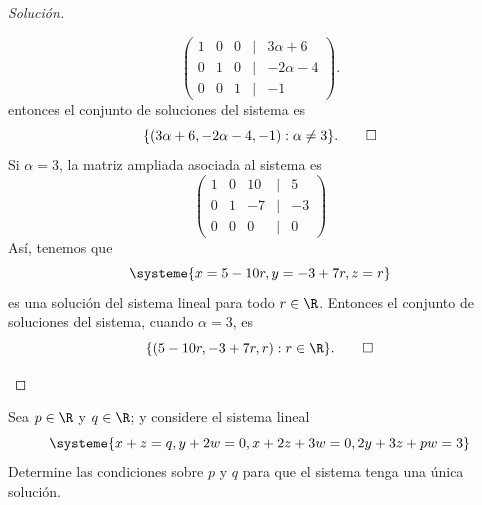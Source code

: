 \documentclass[a4,11pt]{aleph-notas}
\begin{document}
\begin{proof}[Solución]
\begin{enumerate}
    \[
        \begin{pmatrix}
        1&0&0&|& 3 \alpha+6\\
        0&1&0&|&-2\alpha - 4\\
        0&0&1&|& -1
        \end{pmatrix}               .
    \]
    entonces el conjunto de soluciones del sistema es 
    \[
        \{(3 \alpha+6,-2\alpha - 4,-1):\alpha \neq 3\}.\qedhere
    \]
    Si $\alpha = 3 $, la matriz ampliada asociada al sistema es
    \[
        \begin{pmatrix}
        1&0&10&|&5\\
        0&1&-7&|&-3\\
        0&0&0&|&0
        \end{pmatrix}
    \]
    Así, tenemos que
    \[
    \systeme{x = 5 - 10r, y= -3 +7r, z= r}
    \]
    es una solución del sistema lineal para todo $r \in \R$. Entonces el conjunto de soluciones del sistema, cuando $\alpha = 3$, es
    \[
        \{(5 - 10r,-3 +7r,r):r \in \R\}.\qedhere
    \]
    
 \end{enumerate}
\end{proof}


\begin{ejer}
    Sea $p \in \R$ y $q \in \R$; y considere el sistema lineal
    \[
    \systeme{x+z=q, y+2w=0, x+2z+3w=0, 2y+3z+pw=3}
    \]
    Determine las condiciones sobre $p$ y $q$ para que el sistema tenga una única solución.
\end{ejer}
\end{document}
